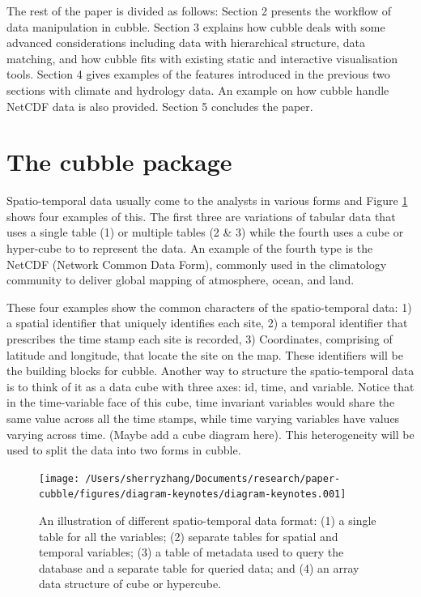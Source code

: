 \documentclass[
]{jss}
\begin{document}
The rest of the paper is divided as follows: Section 2 presents the
workflow of data manipulation in cubble. Section 3 explains how cubble
deals with some advanced considerations including data with hierarchical
structure, data matching, and how cubble fits with existing static and
interactive visualisation tools. Section 4 gives examples of the
features introduced in the previous two sections with climate and
hydrology data. An example on how cubble handle NetCDF data is also
provided. Section 5 concludes the paper.

\hypertarget{the-cubble-package}{%
\section{The cubble package}\label{the-cubble-package}}

Spatio-temporal data usually come to the analysts in various forms and
Figure \ref{fig:illu-input} shows four examples of this. The first three
are variations of tabular data that uses a single table (1) or multiple
tables (2 \& 3) while the fourth uses a cube or hyper-cube to to
represent the data. An example of the fourth type is the NetCDF (Network
Common Data Form), commonly used in the climatology community to deliver
global mapping of atmosphere, ocean, and land.

These four examples show the common characters of the spatio-temporal
data: 1) a spatial identifier that uniquely identifies each site, 2) a
temporal identifier that prescribes the time stamp each site is
recorded, 3) Coordinates, comprising of latitude and longitude, that
locate the site on the map. These identifiers will be the building
blocks for cubble. Another way to structure the spatio-temporal data is
to think of it as a data cube with three axes: id, time, and variable.
Notice that in the time-variable face of this cube, time invariant
variables would share the same value across all the time stamps, while
time varying variables have values varying across time. (Maybe add a
cube diagram here). This heterogeneity will be used to split the data
into two forms in cubble.

\begin{CodeChunk}
\begin{figure}

{\centering \texttt{[image: /Users/sherryzhang/Documents/research/paper-cubble/figures/diagram-keynotes/diagram-keynotes.001]} 

}

\caption[An illustration of different spatio-temporal data format]{An illustration of different spatio-temporal data format: (1) a single table for all the variables; (2) separate tables for spatial and temporal variables; (3) a table of metadata used to query the database and a separate table for queried data; and (4) an array data structure of cube or hypercube.}\label{fig:illu-input}
\end{figure}
\end{CodeChunk}
\end{document}
